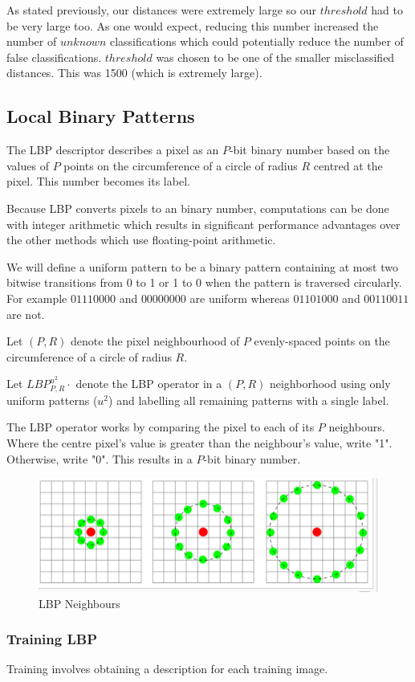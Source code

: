 \documentclass{article}
\begin{document}
As stated previously, our distances were extremely large so our $threshold$ had to be very large too. As one would expect, reducing this number increased the number of $unknown$ classifications which could potentially reduce the number of false classifications. $threshold$ was chosen to be one of the smaller misclassified distances. This was 1500 (which is extremely large).

\subsection{Local Binary Patterns}
The LBP descriptor describes a pixel as an $P$-bit binary number based on the values of $P$ points on the circumference of a circle of radius $R$ centred at the pixel. This number becomes its label.

Because LBP converts pixels to an binary number, computations can be done with integer arithmetic which results in significant performance advantages over the other methods which use floating-point arithmetic.

We will define a uniform pattern to be a binary pattern containing at most two bitwise transitions from 0 to 1 or 1 to 0 when the pattern is traversed circularly. For example $01110000$ and $00000000$ are uniform whereas $01101000$ and $00110011$ are not.

Let $(P, R)$ denote the pixel neighbourhood of $P$ evenly-spaced points on the circumference of a circle of radius $R$.

Let $LBP^{u^2}_{P,R}\cdot$ denote the LBP operator in a $(P, R)$ neighborhood using only uniform patterns ($u^2$) and labelling all remaining patterns with a single label.

The LBP operator works by comparing the pixel to each of its $P$ neighbours. Where the centre pixel's value is greater than the neighbour's value, write "1". Otherwise, write "0". This results in a $P$-bit binary number.

\begin{figure}[H]
\centering
\includegraphics[width=0.4\linewidth]{./lbp}
\caption{LBP Neighbours}
\label{fig:lbp}
\end{figure}

\subsubsection{Training LBP}
Training involves obtaining a description for each training image.
\end{document}
